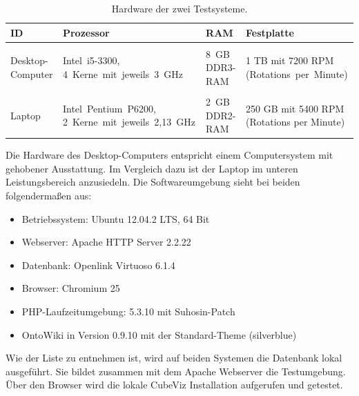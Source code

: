 \documentclass[11pt]{article}
\newcommand{\com}[1]{\marginpar{\em {\small{#1}}}} %
\begin{document}
\begin{table}[htbp]
\small
\begin{tabularx}{400pt}{p{1.5cm} p{4.7cm} p{2cm} p{3.9cm}}
    \textbf{ID} &
    \textbf{Prozessor} &
    \textbf{RAM} &
    \textbf{Festplatte}
\\
\toprule 
\\[0.1cm]
    Desktop-Computer & \mbox{Intel i5-3300}, \mbox{4 Kerne mit jeweils 3 GHz} & \mbox{8 GB} \mbox{DDR3-RAM} & 1 TB mit 7200 RPM \mbox{(Rotations per Minute)} \\[0.4cm]
    
\toprule    
\\[0.1cm] 
    
    Laptop & \mbox{Intel Pentium P6200}, \mbox{2 Kerne mit jeweils 2,13 GHz} & \mbox{2 GB} \mbox{DDR2-RAM} & 250 GB mit 5400 RPM (Rotations per Minute) \\[0.2cm]

\bottomrule

\end{tabularx}
\caption{Hardware der zwei Testsysteme.}
\label{tab:evaluationTestEnvironment}
\end{table}


\noindent
Die Hardware des Desktop-Computers entspricht einem Computersystem mit gehobener Ausstattung. Im Vergleich dazu ist der Laptop im unteren Leistungsbereich anzusiedeln. Die\com{Software-umgebung} Softwareumgebung sieht bei beiden folgendermaßen aus:

\begin{itemize}
    \item Betriebssystem: Ubuntu 12.04.2 LTS, 64 Bit
    \item Webserver: Apache HTTP Server 2.2.22
    \item Datenbank: Openlink Virtuoso 6.1.4
    \item Browser: Chromium 25
    \item PHP-Laufzeitumgebung: 5.3.10 mit Suhosin-Patch
    \item OntoWiki in Version 0.9.10 mit der Standard-Theme (silverblue)
\end{itemize}

\noindent
Wie der Liste zu entnehmen ist, wird auf beiden Systemen die Datenbank lokal ausgeführt. Sie bildet zusammen mit dem Apache Webserver die Testumgebung. Über den Browser wird die lokale CubeViz Installation aufgerufen und getestet. \\
\end{document}
